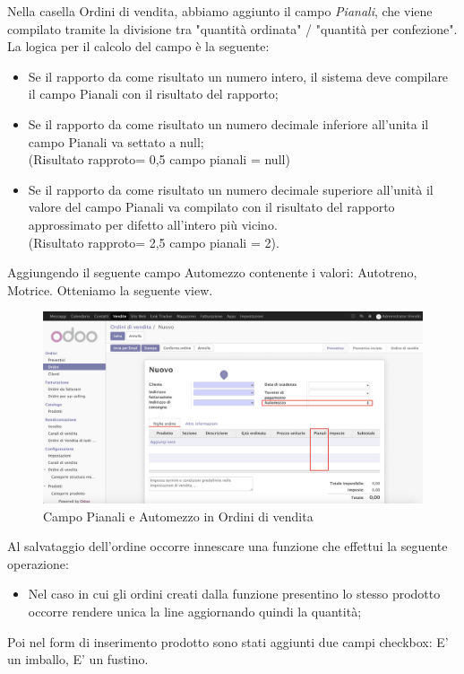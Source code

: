 Nella casella Ordini di vendita, abbiamo aggiunto il campo \textit{Pianali}, che viene compilato tramite la divisione tra "quantità ordinata" / "quantità per confezione".
La logica per il calcolo del campo è la seguente:
\begin{itemize}
	\item Se il rapporto da come risultato un numero intero, il sistema deve compilare il campo Pianali con il risultato del rapporto;
	\item Se il rapporto da come risultato un numero decimale inferiore all'unita il campo Pianali va settato a null;
	\\ (Risultato rapproto= 0,5 campo pianali = null)
	\item Se il rapporto da come risultato un numero decimale superiore all'unità il valore del campo Pianali va compilato con il risultato del rapporto approssimato per difetto all'intero più vicino. \\
	(Risultato rapproto= 2,5 campo pianali = 2).
\end{itemize}
Aggiungendo il seguente campo Automezzo contenente i valori: Autotreno, Motrice. Otteniamo la seguente view.
\vspace*{0.5cm}
\begin{figure}[H]
	\begin{center} \includegraphics[scale=0.3]{figures/pianali}
		\caption[Campo Pianali e Automezzo in Ordini di vendita]{Campo Pianali e Automezzo in Ordini di vendita}
		\label{fig:pianali}
	\end{center}
\end{figure}

Al salvataggio dell'ordine occorre innescare una funzione che effettui la seguente operazione:
\begin{itemize}
\item Nel caso in cui gli ordini creati dalla funzione presentino lo stesso prodotto occorre rendere unica la line aggiornando quindi la quantità;
\end{itemize}
\newpage
Poi nel form di inserimento prodotto sono stati aggiunti due campi checkbox: E' un imballo, E' un fustino.

